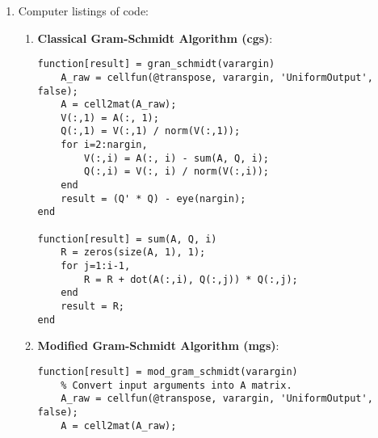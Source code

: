 \documentclass{article}
\newcommand{\mgs}[1] {\underline{\overline{#1}}}
\newcommand{\cgs}[1] {\underline{#1}}
\begin{document}
\begin{enumerate}
\begin{proof}
\begin{align*}
		&= \langle \mgs{v}_2^{(1)}, \mgs{q}_1 \rangle - \langle \mgs{v}_2^{(1)}, \mgs{q}_1 \rangle  \|\mgs{q}_1\|^2 \\
		&= \langle \mgs{v}_2^{(1)}, \mgs{q}_1 \rangle - \langle \mgs{v}_2^{(1)}, \mgs{q}_1 \rangle \cdot 1 \\
		&= 0. \\
		\therefore \mgs{v}_2^{(2)} \text{ is orthogonal to } \mgs{q}_1.
	\end{align*}
	Form $\mgs{q}_2 = \mgs{v}_2^{(2)} / \| \mgs{v}_2^{(2)} \|$. We need to check that $\| \mgs{v}_2^{(2)} \| \neq 0$. \\
	If $\| \mgs{v}_2^{(2)}\| = 0 $, 
	\begin{align*}
	\mgs{v}_2^{(1)} &= \langle \mgs{v}_2^{(1)}, \mgs{q}_1 \rangle \mgs{q}_1 \\
	\implies &\mgs{v}_2^{(1)} \text{ is a multiple of } \mgs{q}_1 \\
	\implies &\cgs{a}_2 \text{ is a multiple of } \mgs{q}_1 \\ 
	\implies &\cgs{a}_2 \text{ is a multiple of } \cgs{a}_1 \\ 
	\end{align*}
	Which leads to a contradiction to $\left\{ \cgs{a}_i \right\}_{i=1}^n \text{ being linearly independent.}$
	\end{proof}
	\item Computer listings of code:
	\begin{enumerate}
		\item \textbf{Classical Gram-Schmidt Algorithm (cgs)}:
		\begin{verbatim}
function[result] = gran_schmidt(varargin)
    A_raw = cellfun(@transpose, varargin, 'UniformOutput', false);  
    A = cell2mat(A_raw);
    V(:,1) = A(:, 1);
    Q(:,1) = V(:,1) / norm(V(:,1));
    for i=2:nargin,
        V(:,i) = A(:, i) - sum(A, Q, i);
        Q(:,i) = V(:, i) / norm(V(:,i));
    end
    result = (Q' * Q) - eye(nargin);
end

function[result] = sum(A, Q, i)
    R = zeros(size(A, 1), 1);
    for j=1:i-1,
        R = R + dot(A(:,i), Q(:,j)) * Q(:,j);
    end    
    result = R;
end
		\end{verbatim}
		\item \textbf{Modified Gram-Schmidt Algorithm (mgs)}:
		\begin{verbatim}
function[result] = mod_gram_schmidt(varargin)
    % Convert input arguments into A matrix.
    A_raw = cellfun(@transpose, varargin, 'UniformOutput', false);  
    A = cell2mat(A_raw);
    

\end{verbatim}
\end{enumerate}
\end{enumerate}
\end{document}
